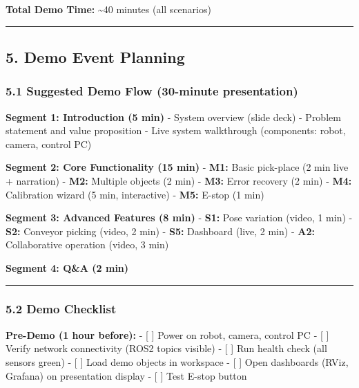 \documentclass[
]{article}
\begin{document}
\textbf{Total Demo Time:} \textasciitilde40 minutes (all scenarios)

\begin{center}\rule{0.5\linewidth}{0.5pt}\end{center}

\hypertarget{demo-event-planning}{%
\subsection{5. Demo Event Planning}\label{demo-event-planning}}

\hypertarget{suggested-demo-flow-30-minute-presentation}{%
\subsubsection{5.1 Suggested Demo Flow (30-minute
presentation)}\label{suggested-demo-flow-30-minute-presentation}}

\textbf{Segment 1: Introduction (5 min)} - System overview (slide deck)
- Problem statement and value proposition - Live system walkthrough
(components: robot, camera, control PC)

\textbf{Segment 2: Core Functionality (15 min)} - \textbf{M1:} Basic
pick-place (2 min live + narration) - \textbf{M2:} Multiple objects (2
min) - \textbf{M3:} Error recovery (2 min) - \textbf{M4:} Calibration
wizard (5 min, interactive) - \textbf{M5:} E-stop (1 min)

\textbf{Segment 3: Advanced Features (8 min)} - \textbf{S1:} Pose
variation (video, 1 min) - \textbf{S2:} Conveyor picking (video, 2 min)
- \textbf{S5:} Dashboard (live, 2 min) - \textbf{A2:} Collaborative
operation (video, 3 min)

\textbf{Segment 4: Q\&A (2 min)}

\begin{center}\rule{0.5\linewidth}{0.5pt}\end{center}

\hypertarget{demo-checklist}{%
\subsubsection{5.2 Demo Checklist}\label{demo-checklist}}

\textbf{Pre-Demo (1 hour before):} - {[} {]} Power on robot, camera,
control PC - {[} {]} Verify network connectivity (ROS2 topics visible) -
{[} {]} Run health check (all sensors green) - {[} {]} Load demo objects
in workspace - {[} {]} Open dashboards (RViz, Grafana) on presentation
display - {[} {]} Test E-stop button
\end{document}
